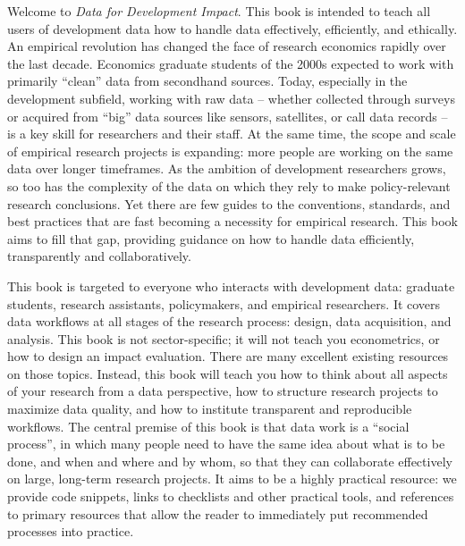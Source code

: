 \begin{fullwidth}
Welcome to \textit{Data for Development Impact}.
This book is intended to teach all users of development data 
how to handle data effectively, efficiently, and ethically. 
An empirical revolution has changed the face of research economics rapidly over the last decade. 
Economics graduate students of the 2000s expected to work with primarily ``clean'' data from secondhand sources. 
Today, especially in the development subfield, working with raw data -- 
whether collected through surveys or acquired from ``big'' data sources like sensors, satellites, or call data records -- 
is a key skill for researchers and their staff. 
At the same time, the scope and scale of empirical research projects is expanding: 
more people are working on the same data over longer timeframes. 
As the ambition of development researchers grows, so too has the complexity of the data
on which they rely to make policy-relevant research conclusions. 
Yet there are few guides to the conventions, standards, and best practices 
that are fast becoming a necessity for empirical research.
This book aims to fill that gap, providing guidance on how to handle data efficiently, transparently and collaboratively. 

This book is targeted to everyone who interacts with development data: 
graduate students, research assistants, policymakers, and empirical researchers. 
It covers data workflows at all stages of the research process: design, data acquisition, and analysis.
This book is not sector-specific; it will not teach you econometrics, or how to design an impact evaluation. 
There are many excellent existing resources on those topics. 
Instead, this book will teach you how to think about all aspects of your research from a data perspective, 
how to structure research projects to maximize data quality, 
and how to institute transparent and reproducible workflows. 
The central premise of this book is that data work is a ``social process'',
in which many people need to have the same idea about what is to be done, and when and where and by whom,
so that they can collaborate effectively on large, long-term research projects.
It aims to be a highly practical resource: we provide code snippets, links to checklists and other practical tools, 
and references to primary resources that allow the reader to immediately put recommended processes into practice. 


\end{fullwidth}

